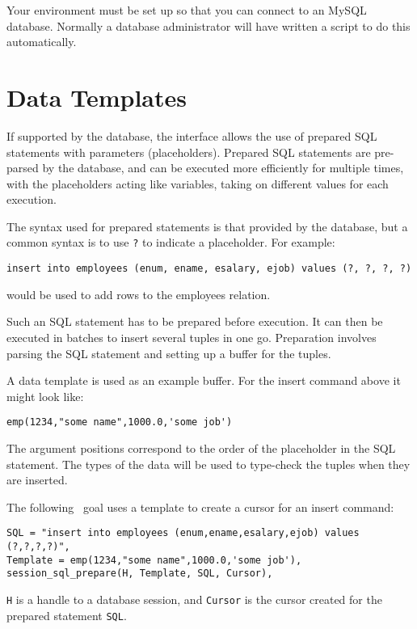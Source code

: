 Your environment must be set up so that you can connect to an
MySQL database. Normally a database administrator will have written
a script to do this automatically. 
\section{Data Templates}
\label{data-templates}

If supported by the database, the interface allows the use of
prepared SQL statements with parameters (placeholders). Prepared SQL
statements are pre-parsed by the database, and can be executed more
efficiently for multiple times, with the placeholders acting like variables,
taking on different values for each execution.

The syntax used for
prepared statements is that provided by the database, but a common syntax
is to use \verb'?' to indicate a placeholder. For example:
\begin{verbatim}
insert into employees (enum, ename, esalary, ejob) values (?, ?, ?, ?)
\end{verbatim}
would be used to add rows to the employees relation.

Such an SQL statement has to be prepared before execution. It can then
be executed in batches to insert several tuples in one go. Preparation
involves parsing the SQL statement and setting up a buffer for the tuples.

A data template is used as an example buffer. For the insert command above it
might look like:

\begin{verbatim}
emp(1234,"some name",1000.0,'some job')
\end{verbatim}

The argument positions correspond to the order of the placeholder in the
SQL statement.
The types of the data will be used to type-check the tuples when they
are inserted.

The following \eclipse\ goal uses a template to create a cursor for an insert
command:
\begin{verbatim}
SQL = "insert into employees (enum,ename,esalary,ejob) values (?,?,?,?)",
Template = emp(1234,"some name",1000.0,'some job'),
session_sql_prepare(H, Template, SQL, Cursor),
\end{verbatim}
\verb'H' is a handle to a database session, and \verb'Cursor' is the cursor
created for the prepared statement \verb'SQL'.

